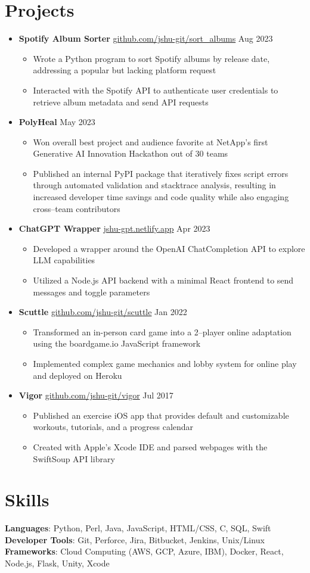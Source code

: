 \documentclass[letterpaper,11pt]{article}
\newcommand{\sectionStart}{\begin{itemize}[leftmargin=0in, label={}]}
\newcommand{\sectionEnd}{\end{itemize}\vspace{-8pt}}
\newcommand{\singleHeading}[2]{
  \item
    #1 \hspace*{\fill} #2 \\
    \vspace{-6pt}
}
\newcommand{\itemListStart}{\begin{itemize}}
\newcommand{\itemListEnd}{\end{itemize}\vspace{-12pt}}
\newcommand{\resumeItem}[1]{
  \item
    \small #1
    \vspace{-3pt} %
}
\begin{document}
  \section{Projects}
    \sectionStart
      \singleHeading{\textbf{Spotify Album Sorter} \href{https://github.com/jshu-git/sort_albums}{github.com/jshu-git/sort\_albums}}{Aug 2023}
        \itemListStart
          \resumeItem{Wrote a Python program to sort Spotify albums by release date, addressing a popular but lacking platform request}
          \resumeItem{Interacted with the Spotify API to authenticate user credentials to retrieve album metadata and send API requests}
        \itemListEnd
      \singleHeading{\textbf{PolyHeal}}{May 2023}
        \itemListStart
          \resumeItem{Won overall best project and audience favorite at NetApp's first Generative AI Innovation Hackathon out of 30 teams}
          \resumeItem{Published an internal PyPI package that iteratively fixes script errors through automated validation and stacktrace analysis, resulting in increased developer time savings and code quality while also engaging cross--team contributors}
        \itemListEnd
      \singleHeading{\textbf{ChatGPT Wrapper} \href{https://jshu-gpt.netlify.app}{jshu-gpt.netlify.app}}{Apr 2023}
        \itemListStart
          \resumeItem{Developed a wrapper around the OpenAI ChatCompletion API to explore LLM capabilities}
          \resumeItem{Utilized a Node.js API backend with a minimal React frontend to send messages and toggle parameters}
        \itemListEnd
      \singleHeading{\textbf{Scuttle} \href{https://github.com/jshu-git/scuttle}{github.com/jshu-git/scuttle}}{Jan 2022}
        \itemListStart
          \resumeItem{Transformed an in-person card game into a 2--player online adaptation using the boardgame.io JavaScript framework}
          \resumeItem{Implemented complex game mechanics and lobby system for online play and deployed on Heroku}
        \itemListEnd
      \singleHeading{\textbf{Vigor} \href{https://github.com/jshu-git/vigor}{github.com/jshu-git/vigor}}{Jul 2017}
        \itemListStart
          \resumeItem{Published an exercise iOS app that provides default and customizable workouts, tutorials, and a progress calendar}
          \resumeItem{Created with Apple's Xcode IDE and parsed webpages with the SwiftSoup API library}
        \itemListEnd
    \sectionEnd

  \section{Skills}
    \sectionStart
      \small{
        \item{
          \textbf{Languages}{: Python, Perl, Java, JavaScript, HTML/CSS, C, SQL, Swift} \\
          \textbf{Developer Tools}{: Git, Perforce, Jira, Bitbucket, Jenkins, Unix/Linux} \\
          \textbf{Frameworks}{: Cloud Computing (AWS, GCP, Azure, IBM), Docker, React, Node.js, Flask, Unity, Xcode} \\
        }
      }
    \sectionEnd
    \vspace{-6pt} %
\end{document}
